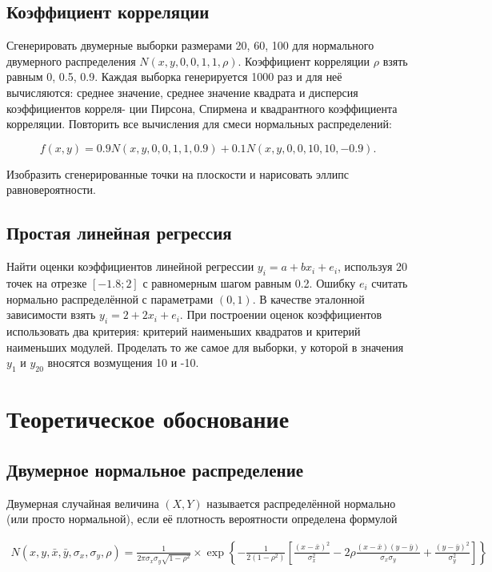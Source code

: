 \documentclass[12pt,a4paper]{article}
\begin{document}
	\subsection{Коэффициент корреляции}

	Сгенерировать двумерные выборки размерами 20, 60, 100 для нормального
	двумерного распределения \( N(x, y, 0, 0, 1, 1, \rho) \). Коэффициент
	корреляции \( \rho \) взять равным 0, 0.5, 0.9. Каждая выборка
	генерируется 1000 раз и для неё вычисляются: среднее значение, среднее
	значение квадрата и дисперсия коэффициентов корреля- ции Пирсона,
	Спирмена и квадрантного коэффициента корреляции. Повторить все
	вычисления для смеси нормальных распределений:

	\[
		f(x, y) = 0.9N(x, y, 0, 0, 1, 1, 0.9) + 0.1N(x, y, 0, 0, 10, 10, -0.9).
	\]

	Изобразить сгенерированные точки на плоскости и нарисовать эллипс
	равновероятности.

	\subsection{Простая линейная регрессия}

	Найти оценки коэффициентов линейной регрессии \( y_i = a + bx_i + e_i \),
	используя 20 точек на отрезке \( [-1.8; 2] \) с равномерным шагом равным
	0.2. Ошибку \( e_i \) считать нормально распределённой с параметрами
	\( (0, 1) \). В качестве эталонной зависимости взять
	\( y_i = 2 + 2x_i + e_i \). При построении оценок коэффициентов
	использовать два критерия: критерий наименьших квадратов и критерий
	наименьших модулей. Проделать то же самое для выборки, у которой в
	значения \( y_1 \) и \( y_{20} \) вносятся возмущения 10 и -10.

	\section{Теоретическое обоснование}

	\subsection{Двумерное нормальное распределение}

	Двумерная случайная величина \( (X, Y) \) называется распределённой
	нормально (или просто нормальной), если её плотность вероятности
	определена формулой

	\begin{align} \label{eq:multivariate_normal}
		N(x, y, \bar x, \bar y, \sigma_x, \sigma_y, \rho) = \frac{1}{2 \pi \sigma_x
		\sigma_y \sqrt{1 - \rho^2}} \times \exp \left \{ -\frac{1}{2(1 - \rho^2)}
		\left [ \frac{(x - \bar x)^2}{\sigma_x^2} - 2 \rho \frac{(x - \bar x)
		(y - \bar y)}{\sigma_x \sigma_y} + \frac{(y - \bar y)^2}{\sigma_y^2}
		\right ] \right \}
	\end{align}
\end{document}
